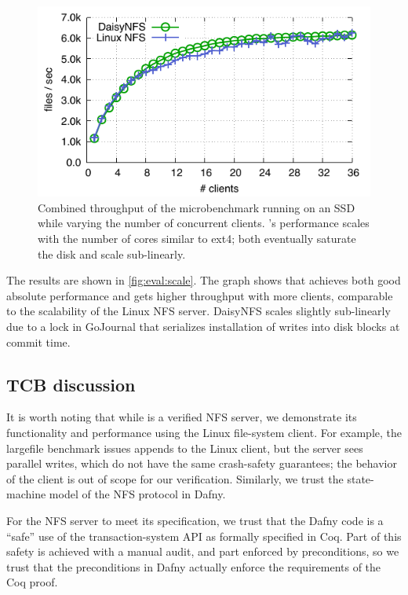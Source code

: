 \begin{figure}
  \includegraphics{daisy-nfs/fig/scale.pdf}
  \caption{Combined throughput of the  microbenchmark running on
    an SSD while
    varying the number of concurrent clients. \sys's performance scales with the
    number of cores similar to ext4; both eventually saturate the disk and scale
    sub-linearly.}
  \label{fig:eval:scale}
\end{figure}

The results are shown in \autoref{fig:eval:scale}. The graph shows that \sys
achieves both good absolute performance and gets higher throughput with more
clients, comparable to the scalability of the Linux NFS server.
DaisyNFS scales slightly sub-linearly due to a lock in GoJournal that serializes
installation of writes into disk blocks at commit time.


\subsection{TCB discussion}

It is worth noting that while \sys is a verified NFS server, we demonstrate its
functionality and performance using the Linux file-system client. For example,
the largefile benchmark issues appends to the Linux client, but the server sees
parallel writes, which do not have the same crash-safety guarantees; the
behavior of the client is out of scope for our verification. Similarly, we trust
the state-machine model of the NFS protocol in Dafny.

For the NFS server to meet its specification, we trust that the Dafny code is a
``safe'' use of the transaction-system API as formally specified in Coq. Part of
this safety is achieved with a manual audit, and part enforced by preconditions,
so we trust that the preconditions in Dafny actually enforce the requirements of
the Coq proof.

